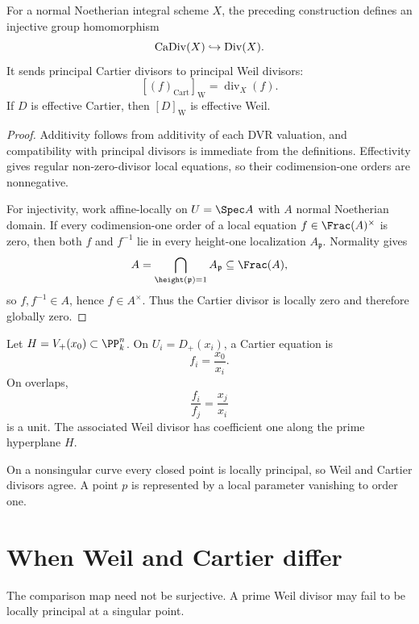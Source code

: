 \begin{theorem}\label{thm:vi40-cartier-weil}
For a normal Noetherian integral scheme \(X\), the preceding construction defines an injective group homomorphism
\[
 \operatorname{CaDiv}(X)\hookrightarrow\operatorname{Div}(X).
\]
It sends principal Cartier divisors to principal Weil divisors:
\[
 [(f)_{\mathrm{Cart}}]_{\mathrm W}=\operatorname{div}_X(f).
\]
If \(D\) is effective Cartier, then \([D]_{\mathrm W}\) is effective Weil.
\end{theorem}

\begin{proof}
Additivity follows from additivity of each DVR valuation, and compatibility with principal divisors is immediate from the definitions.  Effectivity gives regular non-zero-divisor local equations, so their codimension-one orders are nonnegative.

For injectivity, work affine-locally on \(U=\Spec A\) with \(A\) normal Noetherian domain.  If every codimension-one order of a local equation \(f\in\Frac(A)^\times\) is zero, then both \(f\) and \(f^{-1}\) lie in every height-one localization \(A_{\mathfrak p}\).  Normality gives
\[
 A=\bigcap_{\height(\mathfrak p)=1}A_{\mathfrak p}\subseteq\Frac(A),
\]
so \(f,f^{-1}\in A\), hence \(f\in A^\times\).  Thus the Cartier divisor is locally zero and therefore globally zero.
\end{proof}



\begin{example}\label{ex:vi40-projective-hyperplane}
Let \(H=V_+(x_0)\subset\PP^n_k\).  On \(U_i=D_+(x_i)\), a Cartier equation is
\[
 f_i=\frac{x_0}{x_i}.
\]
On overlaps,
\[
 \frac{f_i}{f_j}=\frac{x_j}{x_i}
\]
is a unit.  The associated Weil divisor has coefficient one along the prime hyperplane \(H\).
\end{example}

\begin{example}\label{ex:vi40-expand-03}
On a nonsingular curve every closed point is locally principal, so Weil and Cartier divisors agree.  A point $p$ is represented by a local parameter vanishing to order one.
\end{example}
\section{When Weil and Cartier differ}
The comparison map need not be surjective.  A prime Weil divisor may fail to be locally principal at a singular point.

